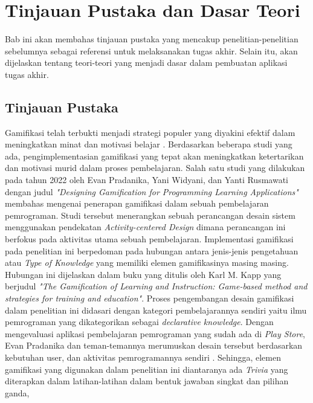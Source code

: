 \chapter{Tinjauan Pustaka dan Dasar Teori}
Bab ini akan membahas tinjauan pustaka yang mencakup penelitian-penelitian sebelumnya sebagai referensi untuk melaksanakan tugas akhir. Selain itu, akan dijelaskan tentang teori-teori yang menjadi dasar dalam pembuatan aplikasi tugas akhir.
\section{Tinjauan Pustaka}
Gamifikasi telah terbukti menjadi strategi populer yang diyakini efektif dalam meningkatkan minat dan motivasi belajar \cite{EnjoyLearningLikeGaming}. 
Berdasarkan beberapa studi yang ada, pengimplementasian gamifikasi yang tepat akan meningkatkan ketertarikan dan motivasi murid dalam proses pembelajaran.
Salah satu studi yang dilakukan pada tahun 2022 oleh Evan Pradanika, Yani Widyani, dan Yanti Rusmawati dengan judul \textit{"Designing Gamification for Programming Learning Applications"} \cite{GamificationInProgLang} membahas mengenai penerapan gamifikasi
dalam sebuah pembelajaran pemrograman. Studi tersebut menerangkan sebuah perancangan desain sistem menggunakan pendekatan \textit{Activity-centered Design} dimana perancangan ini berfokus pada aktivitas utama sebuah pembelajaran\cite{GamificationInProgLang}. 
Implementasi gamifikasi pada penelitian ini berpedoman pada hubungan antara jenis-jenis pengetahuan atau \textit{Type of Knowledge} yang memiliki elemen gamifikasinya masing masing\cite{kapp2012gamification}.
Hubungan ini dijelaskan dalam buku yang ditulis oleh Karl M. Kapp yang berjudul \textit{"The Gamification of Learning and Instruction: Game-based method and strategies for training and education"}\cite{kapp2012gamification}.
Proses pengembangan desain gamifikasi dalam penelitian ini didasari dengan kategori pembelajarannya sendiri yaitu ilmu pemrograman yang dikategorikan sebagai \textit{declarative knowledge}.
Dengan mengevaluasi aplikasi pembelajaran pemrograman yang sudah ada di \textit{Play Store}, Evan Pradanika dan teman-temannya merumuskan desain tersebut berdasarkan kebutuhan user, dan aktivitas pemrogramannya sendiri \cite{GamificationInProgLang}.
Sehingga, elemen gamifikasi yang digunakan dalam penelitian ini diantaranya ada
\textit{Trivia} yang diterapkan dalam latihan-latihan dalam bentuk jawaban singkat dan pilihan ganda,
